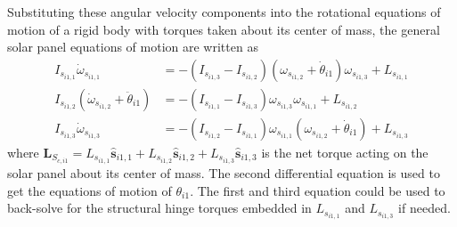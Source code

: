 Substituting these angular velocity components into the rotational equations of motion of a rigid body with torques taken about its center of mass\cite{schaub}, the general solar panel equations of motion are written as
\begin{align}
	I_{s_{i1,1}} \dot\omega_{s_{i1,1}} &= - (I_{s_{i1,3}} - I_{s_{i1,2}}) (\omega_{s_{i1,2}}+\dot\theta_{i1})\omega_{s_{i1,3}} + L_{s_{i1,1}}
	\\
	I_{s_{i1,2}} ( \dot\omega_{s_{i1,2}} + \ddot\theta_{i1}) &= - (I_{s_{i1,1}} - I_{s_{i1,3}}) \omega_{s_{i1,3}} \omega_{s_{i1,1}} + L_{s_{i1,2}}
	\\
	I_{s_{i1,3}} \dot\omega_{s_{i1,3}} &= - (I_{s_{i1,2}} - I_{s_{i1,1}}) \omega_{s_{i1,1}}(\omega_{s_{i1,2}}+ \dot\theta_{i1}) + L_{s_{i1,3}}
\end{align}
where $\bm L_{S_{c,i1}} = L_{s_{i1,1}} \hat{\bm s}_{i1,1} + L_{s_{i1,2}} \hat{\bm s}_{i1,2} + L_{s_{i1,3}} \hat{\bm s}_{i1,3}$ is the net torque acting on the solar panel about its center of mass.  The second differential equation is used to get the equations of motion of $\theta_{i1}$.  The first and third equation could be used to back-solve for the structural hinge torques embedded in $L_{s_{i1,1}}$ and $L_{s_{i1,3}}$ if needed.

